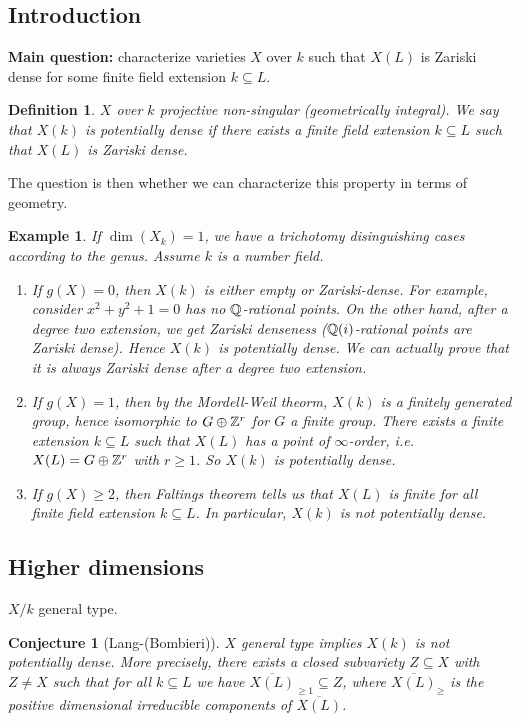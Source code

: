 \documentclass[A4paper, british]{amsart}
\theoremstyle{darkgreentheorem}
\newtheorem{conj}[thm]{Conjecture}
\theoremstyle{darkbluedefinition}
\newtheorem{defn}[thm]{Definition}
\theoremstyle{darkredexample}
\newtheorem{exa}[thm]{Example}
\theoremstyle{remark}
\newcommand{\1}{\mathbbm{1}}
\newcommand{\op}{\oplus}
\newcommand{\sub}{\subseteq}
\begin{document}
\subsection{Introduction}

\textbf{Main question:} characterize varieties $X$ over $k$ such that $X(L)$ is Zariski dense for some finite field extension $k\sub L$.

\begin{defn}
    $X$ over $k$ projective non-singular (geometrically integral).
    We say that $X(k)$ is \textit{potentially dense} if there exists a finite field extension $k\sub L$ such that $X(L)$ is Zariski dense.
\end{defn}

The question is then whether we can characterize this property in terms of geometry.

\begin{exa}
    If $\dim(X_{k})=1$, we have a trichotomy disinguishing cases according to the genus.
    Assume $k$ is a number field.
    \begin{enumerate}
	\item If $g(X)=0$, then $X(k)$ is either empty or Zariski-dense.
	    For example, consider $x^{2}+y^{2}+1=0$ has no $\mathbb{Q}$-rational points.
	    On the other hand, after a degree two extension, we get Zariski denseness ($\mathbb{Q}(i)$-rational points are Zariski dense).
	    Hence $X(k)$ is potentially dense.
	    We can actually prove that it is always Zariski dense after a degree two extension.
	\item If $g(X)=1$, then by the Mordell-Weil theorm, $X(k)$ is a finitely generated group, hence isomorphic to $G\op \Z^{r}$ for $G$ a finite group.
	    There exists a finite extension $k\sub L$ such that $X(L)$ has a point of $\infty$-order, i.e. $X(L)=G\op \Z^{r}$ with $r\geqslant 1$.
	    So $X(k)$ is potentially dense.
	\item If $g(X)\geqslant 2$, then Faltings theorem tells us that $X(L)$ is finite for all finite field extension $k\sub L$.
	    In particular, $X(k)$ is not potentially dense.
    \end{enumerate}
\end{exa}

\subsection{Higher dimensions}

$X/k$ general type.

\begin{conj}[Lang-(Bombieri)]
    $X$ general type implies $X(k)$ is not potentially dense.
    More precisely, there exists a closed subvariety $Z\sub X$ with $Z\neq X$ such that for all $k\sub L$ we have $\overline{X(L)}_{\geqslant 1}\sub Z$, where $\overline{X(L)}_{\geqslant}$ is the positive dimensional irreducible components of $\overline{X(L)}$.
\end{conj}
\end{document}
